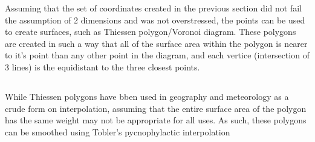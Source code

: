 \documentclass[12pt,letterpaper,notitlepage,onecolumn,final,openbib]{article}
\begin{document}
Assuming that the set of coordinates created in the previous section did not fail the assumption of 2 dimensions and was not overstressed, the points can be used to create surfaces, such as Thiessen polygon/Voronoi diagram.  These polygons are created in such a way that all of the surface area within the polygon is nearer to it's point than any other point in the diagram, and each vertice (intersection of 3 lines) is the equidistant to the three closest points.  

\subsection{}

While Thiessen polygons have bben used in geography and meteorology as a crude form on interpolation, assuming that the entire surface area of the polygon has the same weight may not be appropriate for all uses.  As such, these polygons can be smoothed using Tobler's pycnophylactic interpolation \cite{pycno}
\subsection{}


	\pagebreak
	
	
\end{document}
